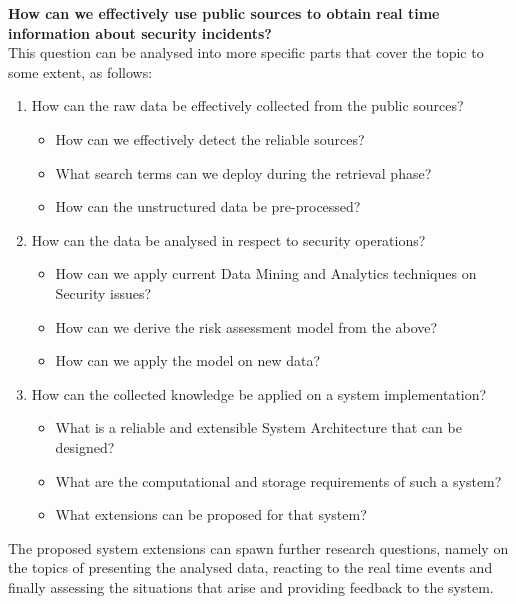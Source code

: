 \documentclass[12pt]{article}
\begin{document}
\noindent
\textbf{How can we effectively use public sources to obtain real time information about security incidents?}\\[0.1cm]

\noindent
This question can be analysed into more specific parts that cover the topic to some extent, as follows:

\begin{enumerate}
	\item How can the raw data be effectively collected from the public sources? 
	\begin{itemize}
		\item How can we effectively detect the reliable sources?
		\item What search terms can we deploy during the retrieval phase?
		\item How can the unstructured data be pre-processed? 
	\end{itemize}
	\item How can the data be analysed in respect to security operations?
	\begin{itemize}
		\item How can we apply current Data Mining and Analytics techniques on Security issues?
		\item How can we derive the risk assessment model from the above?
		\item How can we apply the model on new data?
	\end{itemize}
	\item	How can the collected knowledge be applied on a system implementation?
	\begin{itemize}
		\item What is a reliable and extensible System Architecture that can be designed?
		\item What are the computational and storage requirements of such a system?
		\item What extensions can be proposed for that system?
	\end{itemize}
\end{enumerate}

The proposed system extensions can spawn further research questions, namely on the topics of presenting the analysed data, reacting to the real time events and finally assessing the situations that arise and providing feedback to the system.
\end{document}
